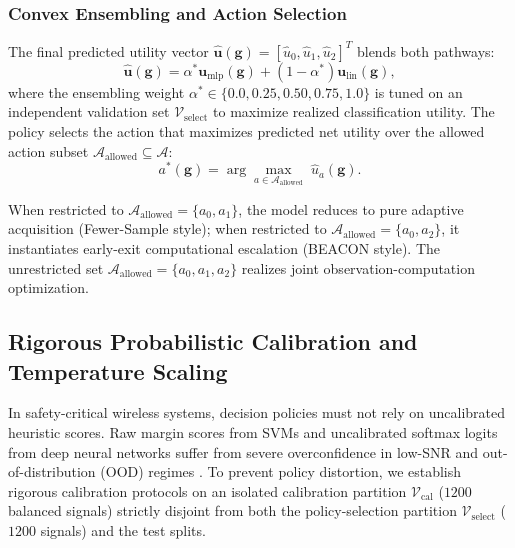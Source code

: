 \subsubsection{Convex Ensembling and Action Selection}
The final predicted utility vector $\hat{\mathbf{u}}(\mathbf{g}) = [\hat{u}_0, \hat{u}_1, \hat{u}_2]^T$ blends both pathways:
\begin{equation}
    \hat{\mathbf{u}}(\mathbf{g}) = \alpha^* \mathbf{u}_{\mathrm{mlp}}(\mathbf{g}) + (1 - \alpha^*) \mathbf{u}_{\mathrm{lin}}(\mathbf{g}),
    \label{eq:blended_utility}
\end{equation}
where the ensembling weight $\alpha^* \in \{0.0, 0.25, 0.50, 0.75, 1.0\}$ is tuned on an independent validation set $\mathcal{V}_{\mathrm{select}}$ to maximize realized classification utility. The policy selects the action that maximizes predicted net utility over the allowed action subset $\mathcal{A}_{\mathrm{allowed}} \subseteq \mathcal{A}$:
\begin{equation}
    a^*(\mathbf{g}) = \arg\max_{a \in \mathcal{A}_{\mathrm{allowed}}} \; \hat{u}_a(\mathbf{g}).
    \label{eq:final_action_choice}
\end{equation}

When restricted to $\mathcal{A}_{\mathrm{allowed}} = \{a_0, a_1\}$, the model reduces to pure adaptive acquisition (Fewer-Sample style); when restricted to $\mathcal{A}_{\mathrm{allowed}} = \{a_0, a_2\}$, it instantiates early-exit computational escalation (BEACON style). The unrestricted set $\mathcal{A}_{\mathrm{allowed}} = \{a_0, a_1, a_2\}$ realizes joint observation-computation optimization.

\subsection{Rigorous Probabilistic Calibration and Temperature Scaling}
\label{subsec:calibration}

In safety-critical wireless systems, decision policies must not rely on uncalibrated heuristic scores. Raw margin scores from SVMs and uncalibrated softmax logits from deep neural networks suffer from severe overconfidence in low-SNR and out-of-distribution (OOD) regimes \cite{yang2026uncertainty}. To prevent policy distortion, we establish rigorous calibration protocols on an isolated calibration partition $\mathcal{V}_{\mathrm{cal}}$ ($1200$ balanced signals) strictly disjoint from both the policy-selection partition $\mathcal{V}_{\mathrm{select}}$ ($1200$ signals) and the test splits.

